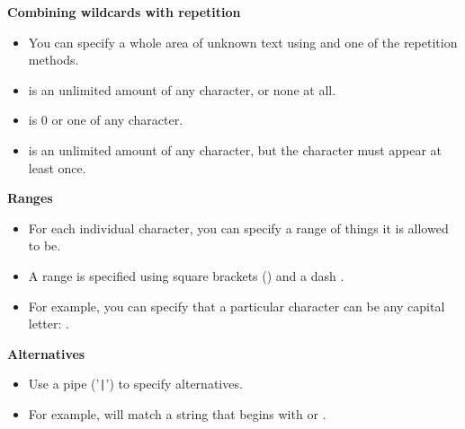 \textbf{Combining wildcards with repetition}
\begin{itemize}
\item You can specify a whole area of unknown text using  and one of the repetition methods.
\item  {} is an unlimited amount of any character, or none at all.
\item {} is 0 or one of any character.
\item {} is an unlimited amount of any character, but the character must appear at least once. 
\end{itemize}


\textbf{Ranges}
\begin{itemize}
\item For each individual character, you can specify a range of things it is allowed to be. 
\item A range is specified using square brackets (\bxshell{[]}) and a dash \bxshell{-}. 
\item For example, you can specify that a particular character can be any capital letter: \bxshell{[A-Z]}.
\end{itemize}

\textbf{Alternatives}
\begin{itemize}
\item Use a pipe ('{\tt |}') to specify alternatives.
\item For example,  will match a string that begins with  or .
\end{itemize}


